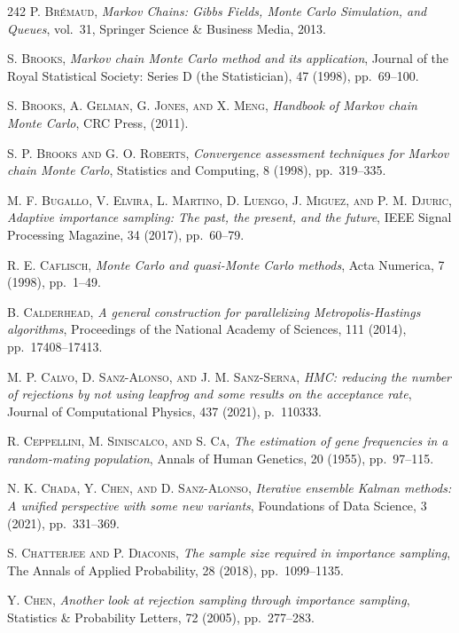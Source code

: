 \begin{thebibliography}{242}
\textsc{P. Br\'emaud},
\textit{Markov Chains: Gibbs Fields, Monte Carlo Simulation, and Queues},
vol.\ 31, Springer Science \& Business Media, 2013.

\textsc{S. Brooks},
\textit{Markov chain Monte Carlo method and its application},
Journal of the Royal Statistical Society: Series D (the Statistician), 47 (1998), pp.\ 69--100.

\textsc{S. Brooks, A. Gelman, G. Jones, and X. Meng},
\textit{Handbook of Markov chain Monte Carlo},
CRC Press, (2011).

\textsc{S. P. Brooks and G. O. Roberts},
\textit{Convergence assessment techniques for Markov chain Monte Carlo},
Statistics and Computing, 8 (1998), pp.\ 319--335.

\textsc{M. F. Bugallo, V. Elvira, L. Martino, D. Luengo, J. Miguez, and P. M. Djuric},
\textit{Adaptive importance sampling: The past, the present, and the future},
IEEE Signal Processing Magazine, 34 (2017), pp.\ 60--79.

\textsc{R. E. Caflisch},
\textit{Monte Carlo and quasi-Monte Carlo methods},
Acta Numerica, 7 (1998), pp.\ 1--49.

\textsc{B. Calderhead},
\textit{A general construction for parallelizing Metropolis-Hastings algorithms},
Proceedings of the National Academy of Sciences, 111 (2014), pp.\ 17408--17413.

\textsc{M. P. Calvo, D. Sanz-Alonso, and J. M. Sanz-Serna},
\textit{HMC: reducing the number of rejections by not using leapfrog and some results on the acceptance rate},
Journal of Computational Physics, 437 (2021), p.\ 110333.

\textsc{R. Ceppellini, M. Siniscalco, and S. Ca},
\textit{The estimation of gene frequencies in a random-mating population},
Annals of Human Genetics, 20 (1955), pp.\ 97--115.

\textsc{N. K. Chada, Y. Chen, and D. Sanz-Alonso},
\textit{Iterative ensemble Kalman methods: A unified perspective with some new variants},
Foundations of Data Science, 3 (2021), pp.\ 331--369.

\textsc{S. Chatterjee and P. Diaconis},
\textit{The sample size required in importance sampling},
The Annals of Applied Probability, 28 (2018), pp.\ 1099--1135.

\textsc{Y. Chen},
\textit{Another look at rejection sampling through importance sampling},
Statistics \& Probability Letters, 72 (2005), pp.\ 277--283.


\end{thebibliography}
